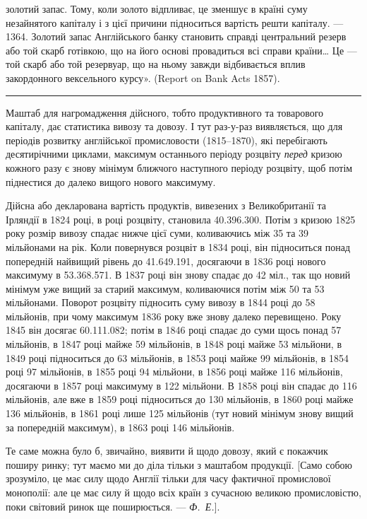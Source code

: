 \parcont{}  %
золотий запас. Тому, коли золото відпливає, це зменшує в країні суму незайнятого
капіталу і з цієї причини підноситься вартість решти капіталу. — 1364. Золотий
запас Англійського банку становить справді центральний резерв або той скарб
готівкою, що на його основі провадиться всі справи країни\dots{} Це — той скарб
або той резервуар, що на ньому завжди відбивається вплив закордонного вексельного
курсу». (Report on Bank Acts 1857).

\pfbreak

Маштаб для нагромадження дійсного, тобто продуктивного та товарового
капіталу, дає статистика вивозу та довозу. І тут раз-у-раз виявляється, що
для періодів розвитку англійської промисловости (1815--1870), які перебігають
десятирічними циклами, максимум останнього періоду розцвіту \emph{перед} кризою
кожного разу є знову мінімум ближчого наступного періоду розцвіту, щоб потім
піднестися до далеко вищого нового максимуму.

Дійсна або декларована вартість продуктів, вивезених з Великобританії та
Ірляндії в 1824 році, в році розцвіту, становила \num{40.396.300}. Потім з кризою
1825 року розмір вивозу спадає нижче цієї суми, коливаючись між 35 та 39 мільйонами
на рік. Коли повернувся розцвіт в 1834 році, він підноситься понад попередній
найвищий рівень до \num{41.649.191}, досягаючи в 1836 році нового
максимуму в \num{53.368.571}. В 1837 році він знову спадає до 42 міл.,
так що новий мінімум уже вищий за старий максимум, коливаючися потім між
50 та 53 мільйонами. Поворот розцвіту підносить суму вивозу в 1844 році до
58 мільйонів, при чому максимум 1836 року вже знову далеко перевищено.
Року 1845 він досягає \num{60.111.082}; потім в 1846 році спадає до суми щось
понад 57 мільйонів, в 1847 році майже 59 мільйонів, в 1848 році майже 53 мільйони,
в 1849 році підноситься до 63 мільйонів, в 1853 році майже 99 мільйонів,
в 1854 році 97 мільйонів, в 1855 році 94 мільйони, в 1856 році майже
116 мільйонів, досягаючи в 1857 році максимуму в 122 мільйони. В 1858 році
він спадає до 116 мільйонів, але вже в 1859 році підноситься до 130 мільйонів,
в 1860 році майже 136 мільйонів, в 1861 році лише 125 мільйонів (тут
новий мінімум знову вищий за попередній максимум), в 1863 році 146 мільйонів.

Те саме можна було б, звичайно, виявити й щодо довозу, який є покажчик
поширу ринку; тут маємо ми до діла тільки з маштабом продукції. [Само
собою зрозуміло, це має силу щодо Англії тільки для часу фактичної промислової
монополії: але це має силу й щодо всіх країн з сучасною великою промисловістю,
поки світовий ринок ще поширюється. — \emph{Ф.~Е.}].

